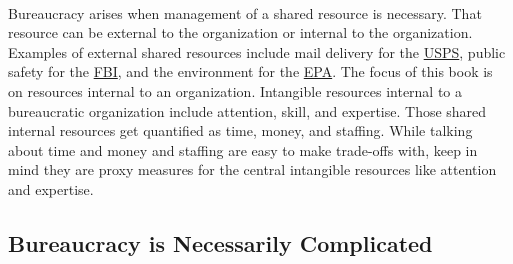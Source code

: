 \ \\

Bureaucracy arises when management of a shared resource is necessary.
That resource can be external to the organization or internal to the organization. Examples of external shared resources include mail delivery for the \href{https://en.wikipedia.org/wiki/United_States_Postal_Service}{USPS},%
%
\iftoggle{WPinmargin}{\marginpar{$>$Wikipedia: USPS}}{}
public safety for the \href{https://en.wikipedia.org/wiki/Federal_Bureau_of_Investigation}{FBI}, 
%
%
and the environment for the \href{https://en.wikipedia.org/wiki/United_States_Environmental_Protection_Agency}{EPA}. 
%
The focus of this book is on resources internal to an organization. Intangible resources internal to a bureaucratic organization include attention, skill, and expertise. Those shared internal resources get quantified as time, money, and staffing. While talking about time and money and staffing are easy to make trade-offs with, keep in mind they are proxy measures for the central intangible resources like attention and expertise.

\subsection*{Bureaucracy is Necessarily Complicated}

